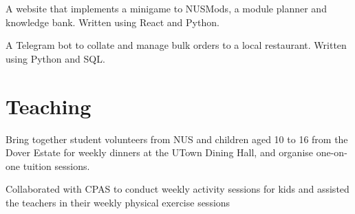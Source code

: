 \documentclass[]{deedy-resume-openfont}
\begin{document}
\begin{minipage}[t]{0.66\textwidth}
\begin{tightemize}
\item A website that implements a minigame to NUSMods, a module planner and knowledge bank. Written using React and Python.
\end{tightemize}
\sectionsep

\begin{tightemize}
\item A Telegram bot to collate and manage bulk orders to a local restaurant. Written using Python and SQL.
\end{tightemize}
\sectionsep


\section{Teaching}
\begin{tightemize}
\item Bring together student volunteers from NUS and children aged 10 to 16 from the Dover Estate for weekly dinners at the UTown Dining Hall, and organise one-on-one tuition sessions.
\end{tightemize}
\sectionsep

\begin{tightemize}
\item Collaborated with CPAS to conduct weekly activity sessions for kids and assisted the teachers in their weekly physical exercise sessions
\end{tightemize}
\sectionsep

\end{minipage} 
\end{document}
